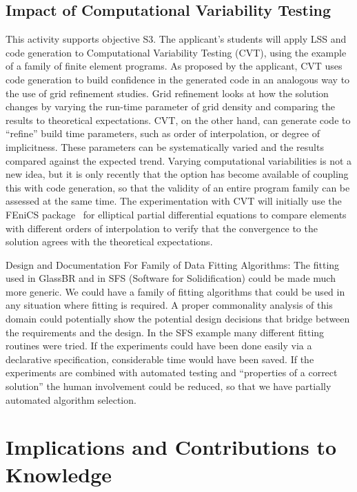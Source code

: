 \documentclass[12pt]{article}
\begin{document}
\subsection{Impact of Computational Variability Testing} \label{SecCVT}

This activity supports objective S3.  The applicant's students will apply LSS
and code generation to Computational Variability Testing (CVT), using the
example of a family of finite element programs.  As proposed by the applicant,
CVT uses code generation to build confidence in the generated code in an
analogous way to the use of grid refinement studies.  Grid refinement looks at
how the solution changes by varying the run-time parameter of grid density and
comparing the results to theoretical expectations.  CVT, on the other hand, can
generate code to ``refine'' build time parameters, such as order of
interpolation, or degree of implicitness.  These parameters can be
systematically varied and the results compared against the expected trend.
Varying computational variabilities is not a new idea, but it is only recently
that the option has become available of coupling this with code generation, so
that the validity of an entire program family can be assessed at the same time.
The experimentation with CVT will initially use the FEniCS
package~\citep{LoggEtAl2012} for elliptical partial differential equations to
compare elements with different orders of interpolation to verify that the
convergence to the solution agrees with the theoretical expectations.

{Design and Documentation For Family of Data Fitting Algorithms}: The fitting
used in GlassBR and in SFS (Software for Solidification) could be made much more
generic.  We could have a family of fitting algorithms that could be used in any
situation where fitting is required.  A proper commonality analysis of this
domain could potentially show the potential design decisions that bridge between
the requirements and the design.  In the SFS example many different fitting
routines were tried.  If the experiments could have been done easily via a
declarative specification, considerable time would have been saved.  If the
experiments are combined with automated testing and ``properties of a correct
solution'' the human involvement could be reduced, so that we have partially
automated algorithm selection.

\section{Implications and Contributions to Knowledge} \label{SecContribKnowledge}
\end{document}
